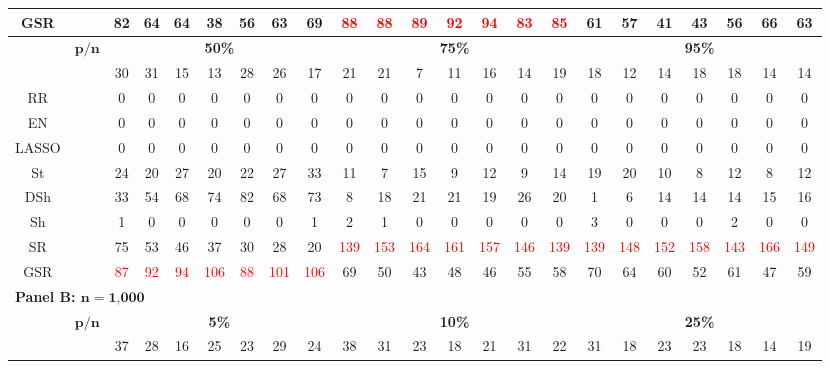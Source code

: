 \begin{table}
{\begin{tabular*}{\textwidth}{@{\extracolsep{\fill}}cc|ccccccc|ccccccc|ccccccc@{}}
GSR &  & 82 & 64 & 64 & 38 & 56 & 63 & 69 & \textcolor{red}{88} & \textcolor{red}{88} & \textcolor{red}{89} & \textcolor{red}{92} & \textcolor{red}{94} & \textcolor{red}{83} & \textcolor{red}{85} & 61 & 57 & 41 & 43 & 56 & 66 & 63 \\
\hline
\multirow{2}{*}{} & $\bm{p/n}$ & \multicolumn{7}{c|}{\textbf{50\%}} & \multicolumn{7}{c|}{\textbf{75\%}} & \multicolumn{7}{c}{\textbf{95\%}} \\
\hline
OLS &  & 30 & 31 & 15 & 13 & 28 & 26 & 17 & 21 & 21 & 7 & 11 & 16 & 14 & 19 & 18 & 12 & 14 & 18 & 18 & 14 & 14 \\
RR &  & 0 & 0 & 0 & 0 & 0 & 0 & 0 & 0 & 0 & 0 & 0 & 0 & 0 & 0 & 0 & 0 & 0 & 0 & 0 & 0 & 0 \\
EN &  & 0 & 0 & 0 & 0 & 0 & 0 & 0 & 0 & 0 & 0 & 0 & 0 & 0 & 0 & 0 & 0 & 0 & 0 & 0 & 0 & 0 \\
LASSO &  & 0 & 0 & 0 & 0 & 0 & 0 & 0 & 0 & 0 & 0 & 0 & 0 & 0 & 0 & 0 & 0 & 0 & 0 & 0 & 0 & 0 \\
St &  & 24 & 20 & 27 & 20 & 22 & 27 & 33 & 11 & 7 & 15 & 9 & 12 & 9 & 14 & 19 & 20 & 10 & 8 & 12 & 8 & 12 \\
DSh &  & 33 & 54 & 68 & 74 & 82 & 68 & 73 & 8 & 18 & 21 & 21 & 19 & 26 & 20 & 1 & 6 & 14 & 14 & 14 & 15 & 16 \\
Sh &  & 1 & 0 & 0 & 0 & 0 & 0 & 1 & 2 & 1 & 0 & 0 & 0 & 0 & 0 & 3 & 0 & 0 & 0 & 2 & 0 & 0 \\
SR &  & 75 & 53 & 46 & 37 & 30 & 28 & 20 & \textcolor{red}{139} & \textcolor{red}{153} & \textcolor{red}{164} & \textcolor{red}{161} & \textcolor{red}{157} & \textcolor{red}{146} & \textcolor{red}{139} & \textcolor{red}{139} & \textcolor{red}{148} & \textcolor{red}{152} & \textcolor{red}{158} & \textcolor{red}{143} & \textcolor{red}{166} & \textcolor{red}{149} \\
GSR &  & \textcolor{red}{87} & \textcolor{red}{92} & \textcolor{red}{94} & \textcolor{red}{106} & \textcolor{red}{88} & \textcolor{red}{101} & \textcolor{red}{106} & 69 & 50 & 43 & 48 & 46 & 55 & 58 & 70 & 64 & 60 & 52 & 61 & 47 & 59 \\
\hline
\multicolumn{23}{l}{\textbf{Panel B: $\bm{n}=\textbf{1,000}$}} \\
\hline
\multirow{2}{*}{} & $\bm{p/n}$ & \multicolumn{7}{c|}{\textbf{5\%}} & \multicolumn{7}{c|}{\textbf{10\%}} & \multicolumn{7}{c}{\textbf{25\%}} \\
\hline
OLS &  & 37 & 28 & 16 & 25 & 23 & 29 & 24 & 38 & 31 & 23 & 18 & 21 & 31 & 22 & 31 & 18 & 23 & 23 & 18 & 14 & 19 \\

\end{tabular*}}
\end{table}
